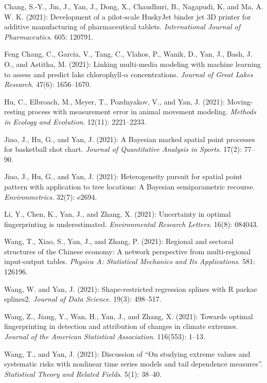 \documentclass[Statistics]{vita}
\begin{document}
\begin{vita}
\begin{Publications}
\begin{RefereedJournalArticles}
  \item Chang, S.-Y., Jin, J., Yan, J., Dong, X., Chaudhuri, B., Nagapudi, K, and Ma, A. W. K. (2021): Development of a pilot-scale HuskyJet binder jet 3D printer for additive manufacturing of pharmaceutical tablets. {\em International Journal of Pharmaceutics\/}. 605: 120791.
  \item Feng Chang, C., Garcia, V., Tang, C., Vlahos, P., Wanik, D., Yan, J., Bash, J. O., and Astitha, M. (2021): Linking multi-media modeling with machine learning to assess and predict lake chlorophyll-$\alpha$ concentrations. {\em Journal of Great Lakes Research\/}. 47(6): 1656--1670.
  \item *Hu, C., Elbroach, M., Meyer, T., Pozdnyakov, V., and Yan, J. (2021): Moving-resting process with measurement error in animal movement modeling. {\em Methods in Ecology and Evolution\/}. 12(11): 2221--2233.
  \item *Jiao, J., Hu, G., and Yan, J. (2021): A Bayesian marked spatial point processes for basketball shot chart. {\em Journal of Quantitative Analysis in Sports\/}. 17(2): 77--90. 
  \item *Jiao, J., Hu, G., and Yan, J. (2021): Heterogeneity pursuit for spatial point pattern with application to tree locations: A Bayesian semiparametric recourse. {\em Environmetrics\/}. 32(7): e2694.
  \item *Li, Y., Chen, K., Yan, J., and Zhang, X. (2021): Uncertainty in optimal fingerprinting is underestimated. {\em Environmental Research Letters\/}. 16(8): 084043.
  \item *Wang, T., Xiao, S., Yan, J., and Zhang, P. (2021): Regional and sectoral structures of the Chinese economy: A network perspective from multi-regional input-output tables. {\em Physica A: Statistical Mechanics and Its Applications\/}. 581: 126196.
  \item *Wang, W. and Yan, J. (2021): Shape-restricted regression splines with R packae splines2. {\em Journal of Data Science\/}. 19(3): 498--517.
  \item *Wang, Z., Jiang, Y., Wan, H., Yan, J., and Zhang, X. (2021): Towards optimal fingerprinting in detection and attribution of changes in climate extremes. {\em Journal of the American Statistical Association\/}. 116(553): 1--13.
  \item Wang, T., and Yan, J. (2021): Discussion of ``On studying extreme values and systematic risks with nonlinear time series models and tail dependence measures''. {\em Statistical Theory and Related Fields\/}. 5(1): 38--40.

\end{RefereedJournalArticles}
\end{Publications}
\end{vita}
\end{document}
